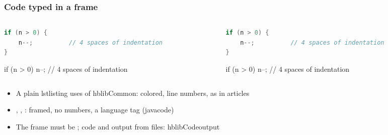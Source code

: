 \documentclass[aspectratio=169,10pt,compress]{beamer}
\begin{document}
\begin{frame}[t,fragile] \frametitle{Code typed in a frame}
	\begin{columns}[T]
		\begin{column}{0.48\textwidth}

\begin{texcode}
\begin{lstlisting}[language=Java]
if (n > 0) {
    n--;          // 4 spaces of indentation
}
\end{lstlisting}

\begin{javacode}
if (n > 0) {
    n--;          // 4 spaces of indentation
}
\end{javacode}
\end{texcode}

		\end{column}
		\begin{column}{0.48\textwidth}

\begin{lstlisting}[language=Java]
if (n > 0) {
    n--;          // 4 spaces of indentation
}
\end{lstlisting}

			\vspace{6pt}

\begin{javacode}
if (n > 0) {
    n--;          // 4 spaces of indentation
}
\end{javacode}

		\end{column}
	\end{columns}

	\begin{itemize}\small
		\item A plain lstlisting uses  of hblibCommon: colored, line numbers, as in articles
		\item {}, , : framed, no numbers, a language tag (javacode)
		\item The frame must be \hCode{[fragile]}; code and output from files: hblibCodeoutput
	\end{itemize}
\end{frame}
\end{document}

